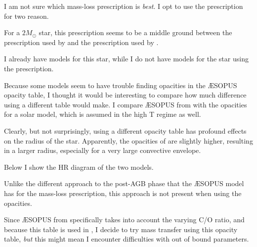 \documentclass[a4paper,10pt]{article}
\begin{document}
I am not sure which mass-loss prescription is \emph{best}. I opt to use the \citet{vassiliadis1993} prescription for two reason.
\begin{enumd}
    \item For a \(2M_\odot\) star, this prescription seems to be a middle ground between the prescription used by \citet{rees2024b} and the prescription used by \citet{cinquegrana2022}.
    \item  I already have models for this star, while I do not have models for the star using the \citet{trabucchi2018} prescription.
\end{enumd}



Because some models seem to have trouble finding opacities in the \AE SOPUS opacity table, I thought it would be interesting to compare how much difference using a different table would make.
I compare \AE SOPUS from \citet{marigo2009} with the \citet{ferguson1905} opacities for a \citet{asplund2009} solar model, which is assumed in the high T regime as well.

\begin{figure}[ht]
    \centering
\end{figure}

Clearly, but not surprisingly, using a different opacity table has profound effects on the radius of the star. Apparently, the opacities of \citet{ferguson1905} are slightly higher, resulting in a larger radius, especially for a very large convective envelope.

Below I show the HR diagram of the two models.

\begin{figure}[ht]
    \centering
\end{figure}

Unlike the different approach to the post-AGB phase that the \AE SOPUS model has for the \citet{trabucchi2018} mass-loss prescription, this approach is not present when using the \citet{ferguson1905} opacities.

Since \AE SOPUS from \citet{marigo2009} specifically takes into account the varying C/O ratio, and because this table is used in \citet{rees2024b}, I decide to try mass transfer using this opacity table, \emph{but} this might mean I encounter difficulties with out of bound parameters.

\end{document}
